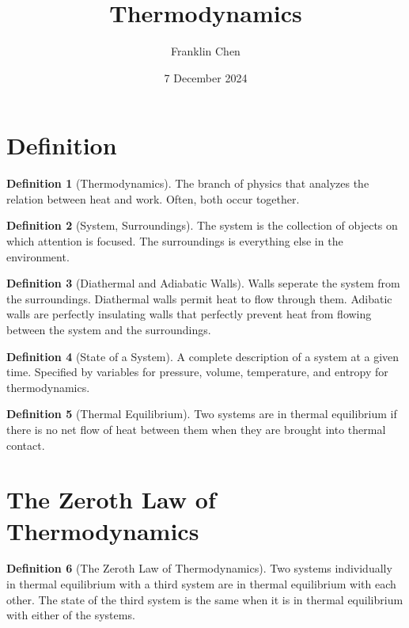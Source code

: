 \documentclass[12pt, a4paper]{article}
\title{Thermodynamics}
\author{Franklin Chen}
\date{7 December 2024}
\theoremstyle{definition}
\newtheorem{definition}{Definition}
\begin{document}
\maketitle
\newpage

\tableofcontents

\section{Definition}
\begin{definition}[Thermodynamics]
    The branch of physics that analyzes the relation between heat and work. Often, both occur together.
\end{definition}

\begin{definition}[System, Surroundings]
    The system is the collection of objects on which attention is focused.
    The surroundings is everything else in the environment.
\end{definition}

\begin{definition}[Diathermal and Adiabatic Walls]
    Walls seperate the system from the surroundings.
    Diathermal walls permit heat to flow through them.
    Adibatic walls are perfectly insulating walls that perfectly prevent heat from flowing between the system and the surroundings.
\end{definition}

\begin{definition}[State of a System]
    A complete description of a system at a given time.
    Specified by variables for pressure, volume, temperature, and entropy for thermodynamics.
\end{definition}

\begin{definition}[Thermal Equilibrium]
    Two systems are in thermal equilibrium if there is no net flow of heat between them when they are brought into thermal contact.
\end{definition}

\section{The Zeroth Law of Thermodynamics}
\begin{definition}[The Zeroth Law of Thermodynamics]
    Two systems individually in thermal equilibrium with a third system are in thermal equilibrium with each other.
    The state of the third system is the same when it is in thermal equilibrium with either of the systems.
\end{definition}
\end{document}
